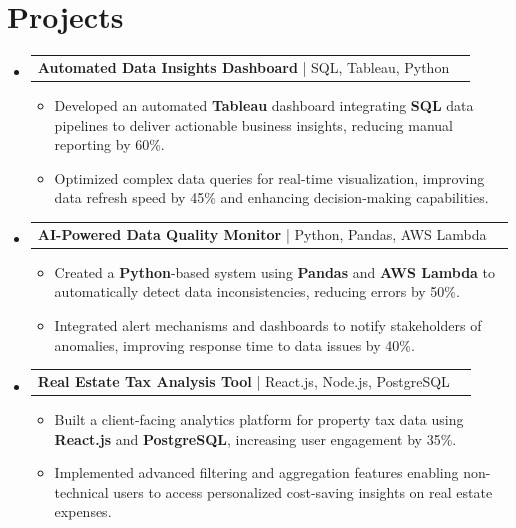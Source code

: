\documentclass[letterpaper,11pt]{article}
\makeatletter
\newcommand{\resumeItem}[1]{
  \item\footnotesize{
    {#1 \vspace{-2pt}}
  }
}
\newcommand{\resumeProjectHeading}[2]{
    \item
    \begin{tabular*}{1.001\textwidth}{l@{\extracolsep{\fill}}r}
      \small#1 & \textbf{\small #2}\\
    \end{tabular*}\vspace{-7pt}
}
\newcommand{\resumeSubHeadingListStart}{\begin{itemize}[leftmargin=0pt, label={}]}
\newcommand{\resumeSubHeadingListEnd}{\end{itemize}}
\newcommand{\resumeItemListStart}{\begin{itemize}[leftmargin=*]}
\newcommand{\resumeItemListEnd}{\end{itemize}\vspace{-5pt}}
\makeatother
\begin{document}
\section{Projects}
    \vspace{-5pt}
    \resumeSubHeadingListStart
          \resumeProjectHeading
              {\textbf{Automated Data Insights Dashboard} | SQL, Tableau, Python}{}
        \resumeItemListStart
            \resumeItem{Developed an automated \textbf{Tableau} dashboard integrating \textbf{SQL} data pipelines to deliver actionable business insights, reducing manual reporting by 60\%.}
            \resumeItem{Optimized complex data queries for real-time visualization, improving data refresh speed by 45\% and enhancing decision-making capabilities.}
        \resumeItemListEnd
        \vspace{-12pt}
    
    \resumeProjectHeading
        {\textbf{AI-Powered Data Quality Monitor} | Python, Pandas, AWS Lambda}{}
        \resumeItemListStart
            \resumeItem{Created a \textbf{Python}-based system using \textbf{Pandas} and \textbf{AWS Lambda} to automatically detect data inconsistencies, reducing errors by 50\%.}
            \resumeItem{Integrated alert mechanisms and dashboards to notify stakeholders of anomalies, improving response time to data issues by 40\%.}
        \resumeItemListEnd
          \vspace{-12pt}
      \resumeProjectHeading
          {\textbf{Real Estate Tax Analysis Tool} | React.js, Node.js, PostgreSQL}{}
          \resumeItemListStart
              \resumeItem{Built a client-facing analytics platform for property tax data using \textbf{React.js} and \textbf{PostgreSQL}, increasing user engagement by 35\%.}
              \resumeItem{Implemented advanced filtering and aggregation features enabling non-technical users to access personalized cost-saving insights on real estate expenses.}
          \resumeItemListEnd 
    \resumeSubHeadingListEnd
\end{document}
